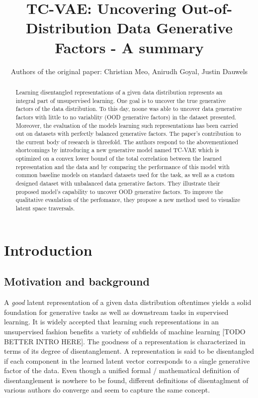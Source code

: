 \documentclass[twoside,11pt]{article}
\begin{document}
\title{TC-VAE: Uncovering Out-of-Distribution Data Generative Factors - A summary}

\author{Authors of the original paper: Christian Meo, Anirudh Goyal, Justin Dauwels}
\maketitle

\begin{abstract}%
  Learning disentangled representations of a given data distribution represents an integral part of unsupervised learning.
  One goal is to uncover the true generative factors of the data distribution.
  To this day, noone was able to uncover data generative factors with little to no variablity (OOD generative factors) in the dataset presented.
  Moreover, the evaluation of the models learning such representations has been carried out on datasets with perfectly balanced generative factors.
  The paper's contribution to the current body of research is threefold. The authors respond to the abovementioned shortcomings by introducing a new generative model named TC-VAE which is optimized on a convex lower bound of the total correlation between the learned representation and the data and by comparing the performance of this model with common baseline models on standard datasets used for the task, as well as a custom designed dataset with unbalanced data generative factors. They illustrate their proposed model's capability to uncover OOD generative factors. To improve the qualitative evaulation of the perfomance, they propose a new method used to visualize latent space traversals.
\end{abstract}

\section{Introduction}
\subsection{Motivation and background}
A \textit{good} latent representation of a given data distribution oftentimes yields a solid foundation for generative tasks as well as downstream tasks in supervised learning. It is widely accepted that learning such representations in an unsupervised fashion benefits a variety of subfields of machine learning [TODO BETTER INTRO HERE].
The goodness of a representation is characterized in terms of its degree of disentanglement. A representation is said to be disentangled if each component in the learned latent vector corresponds to a single generative factor of the data. Even though a unified formal / mathematical definition of disentanglement is nowhere to be found, different definitions of disentaglment of various authors do converge and seem to capture the same concept.
\end{document}
